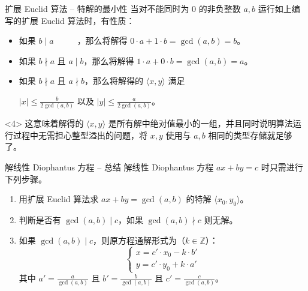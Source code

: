 \documentclass{../pkslide}
\begin{document}
\begin{frame}{扩展 Euclid 算法 -- 特解的最小性}
  当对不能同时为 $0$ 的非负整数 $a, b$ 运行如上编写的扩展 Euclid 算法时，有性质：
  
  \begin{itemize}
    \item<2-> 如果 $b \mid a$\ \hspace{1em}\ $\phantom{a \mid b}$，那么将解得 $0 \cdot a + 1 \cdot b = \gcd(a, b) = b$。
    \item<2-> 如果 $b \nmid a$ 且 $a \mid b$，那么将解得 $1 \cdot a + 0 \cdot b = \gcd(a, b) = a$。
    \item<3-> 如果 $b \nmid a$ 且 $a \nmid b$，那么将解得的 $\langle x, y \rangle$ 满足%
      \begin{center}
        $|x| \le \frac{b}{2 \gcd(a, b)}$ 以及 $|y| \le \frac{a}{2 \gcd(a, b)}$。
      \end{center}
  \end{itemize}
  
  \begin{visibleenv}<4>
    这意味着解得的 $\langle x, y \rangle$ 是所有解中绝对值最小的一组，并且同时说明算法运行过程中无需担心整型溢出的问题，将 $x, y$ 使用与 $a, b$ 相同的类型存储就足够了。
  \end{visibleenv}
\end{frame}

\begin{frame}{解线性 Diophantus 方程 -- 总结}
  解线性 Diophantus 方程 $a x + b y = c$ 时只需进行下列步骤。
  
  \begin{enumerate}
    \item<2-> 用扩展 Euclid 算法求 $a x + b y = \gcd(a, b)$ 的特解 $\langle x_0, y_0 \rangle$。
    \item<3-> 判断是否有 $\gcd(a, b) \mid c$，如果 $\gcd(a, b) \nmid c$ 则无解。
    \item<4> 如果 $\gcd(a, b) \mid c$，则原方程通解形式为（$k \in \mathbb Z$）：%
      \[
        \left\{ \begin{aligned}
          x = c' \cdot x_0 - k \cdot b' \\
          y = c' \cdot y_0 + k \cdot a'
        \end{aligned} \right.
      \]%
      其中 $a' = \frac{a}{\gcd(a, b)}$ 且 $b' = \frac{b}{\gcd(a, b)}$ 且 $c' = \frac{c}{\gcd(a, b)}$。
  \end{enumerate}
\end{frame}
\end{document}
